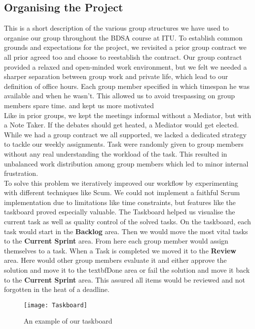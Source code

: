 \subsection{Organising the Project}
This is a short description of the various group structures we have used to organise our group throughout the BDSA course at ITU. To establish common grounds and expectations for the project, we revisited a prior group contract we all prior agreed too and choose to reestablish the contract. Our group contract provided a relaxed and open-minded work environment, but we felt we needed a sharper separation between group work and private life, which lead to our definition of office hours. Each group member specified in which timespan he was available and when he wasn't.  This allowed us to avoid trespassing on group members spare time. and kept us more motivated\\  
Like in prior groups, we kept the meetings informal without a Mediator,  but with a Note Taker. If the debates should  get heated, a Mediator would get elected.
\\While we had a group contract we all supported, we lacked a dedicated strategy to tackle our weekly assignments. Task were randomly given to group members without any real understanding the workload of the task. This resulted in unbalanced work distribution among group members which led to minor internal frustration. \\
To solve this problem we iteratively improved our workflow by experimenting with  different techniques like Scum. We could not implement a faithful Scrum implementation due to limitations like time constraints, but features like the taskboard proved especially valuable. The Taskboard helped us visualise the current task as well as quality control of the solved tasks. On the taskboard, each task would start in the \textbf{Backlog} area. Then we would move the most vital tasks to the \textbf{Current Sprint} area. From here each group member would assign themselves to a task. When a Task is completed we moved it to the \textbf{Review} area.  Here would other group members evaluate it and either approve the solution and move it to the textbf{Done} area or fail the solution and move it back to the \textbf{Current Sprint} area. This assured all items would be reviewed and not forgotten in the heat of a deadline. 


\begin{figure}[H]
	\texttt{[image: Taskboard]}
	\caption{An example of our taskboard}
	\label{fig:rad}
\end{figure}
